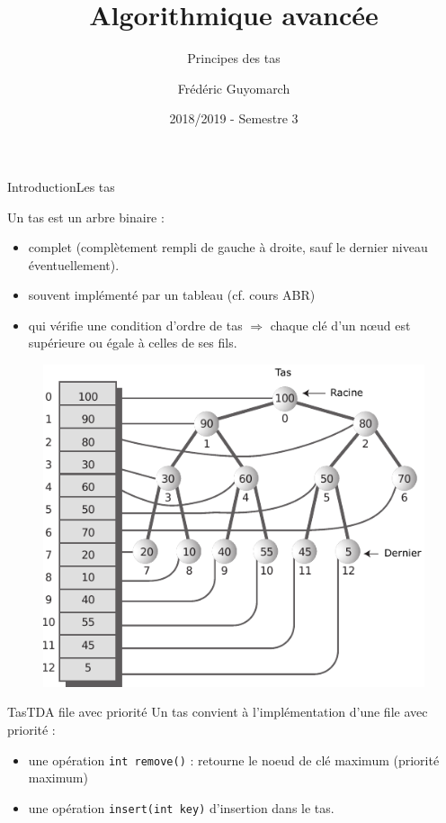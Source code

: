 \documentclass[12pt,a4paper]{beamer}
\title{\textbf{Algorithmique avancée}}
\subtitle{Principes des tas}
\author{Frédéric Guyomarch}
\date{2018/2019 - Semestre 3}
\institute %
{

  Université de Lille1\\
  IUT-A de Lille

}
\newcommand{\hl}[1]{\textcolor{blueemph}{#1}}
\begin{document}
\begin{frame}
\titlepage
\end{frame}


\begin{frame}{Introduction}{Les tas}

Un tas est un arbre binaire : 
\begin{itemize}
\item \hl{complet} (complètement rempli de gauche à droite, sauf le dernier niveau éventuellement).
\item souvent implémenté par un tableau (cf. cours ABR)
\item qui vérifie une \hl{condition d'ordre} de tas $\Rightarrow$ chaque clé d'un n\oe ud est supérieure ou égale à celles de ses fils.
\end{itemize}
\end{frame}


\begin{frame}
\begin{figure}
\includegraphics[scale=1]{figs/heap}
\end{figure}
\end{frame}

\begin{frame}{Tas}{TDA file avec priorité}
Un tas convient à l'implémentation d'une file avec priorité :
\begin{itemize}
\item une opération \texttt{int remove()} : retourne le noeud de clé maximum (priorité maximum)
\item une opération \texttt{insert(int key)} d'insertion dans le tas.
\end{itemize}

\end{frame}
\end{document}
